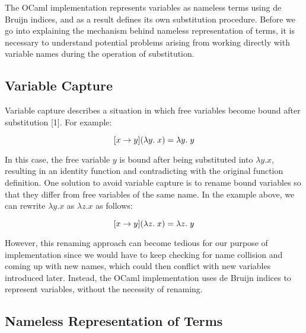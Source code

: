 \documentclass[fleqn, 11pt]{article}
\begin{document}
The OCaml implementation represents variables as nameless terms using de Bruijn indices, and as a result defines its own substitution procedure. 
Before we go into explaining the mechanism behind nameless representation of terms, it is necessary to understand potential problems 
arising from working directly with variable names during the operation of substitution.

\subsection{Variable Capture}

Variable capture describes a situation in which free variables become bound after substitution [1]. For example:

\[
    [x \rightarrow y](\lambda y . \hspace{1mm} x) = \lambda y . \hspace{1mm} y
\]

In this case, the free variable $y$ is bound after being substituted into $\lambda y.x$, resulting in an identity function and 
contradicting with the original function definition. One solution to avoid variable capture is to rename bound variables so that they 
differ from free variables of the same name. In the example above, we can rewrite $\lambda y.x$ as $\lambda z.x$ as follows:

\[
    [x \rightarrow y](\lambda z . \hspace{1mm} x) = \lambda z . \hspace{1mm} y
\]

However, this renaming approach can become tedious for our purpose of implementation since we would have to keep checking for name 
collision and coming up with new names, which could then conflict with new variables introduced later. Instead, the OCaml implementation 
uses de Bruijn indices to represent variables, without the necessity of renaming. 

\subsection{Nameless Representation of Terms}
\end{document}
